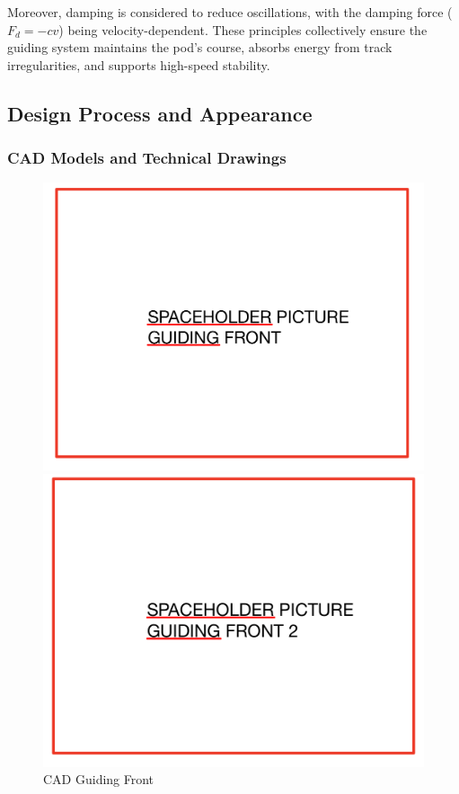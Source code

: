 Moreover, damping is considered to reduce oscillations, with the damping force (\( F_d = -cv \)) being velocity-dependent. These principles collectively ensure the guiding system maintains the pod's course, absorbs energy from track irregularities, and supports high-speed stability.


\subsection{Design Process and Appearance}
\subsubsection{CAD Models and Technical Drawings}

\begin{figure}[!ht]
  \centering
  \begin{minipage}[b]{0.45\linewidth}
    \includegraphics[width=\linewidth]{guiding_front_1.jpg}
    \caption{CAD Guiding Front}
    \label{fig:guiding_front}
  \end{minipage}
  \hspace{0.5cm}
  \begin{minipage}[b]{0.45\linewidth}
    \includegraphics[width=\linewidth]{guiding_front_2.jpg}

\end{minipage}
\end{figure}
